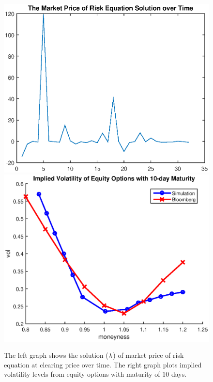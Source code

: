 \documentclass{article}
\begin{document}
\begin{center}
\begin{figure}[tbp]
\centering
\includegraphics[scale = 0.5]{lambda.eps} 
\includegraphics[scale =
0.5]{implied_vol.eps}\newline
\caption{The left graph shows the solution ($\protect\lambda $) of market
price of risk equation at clearing price over time. The right graph plots
implied volatility levels from equity options with maturity of 10 days.}
\label{fig::Put_Option_Vols}
\end{figure}
\end{center}
\end{document}
